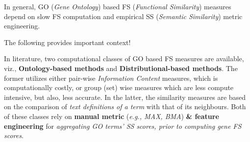 \begin{sloppypar*}
    In general, GO (\textit{Gene Ontology}) based FS (\textit{Functional Similarity})
    measures depend on slow FS computation and empirical SS (\textit{Semantic
    Similarity}) metric engineering. \hfill \break

    \begin{mybox}
        The following provides important context!
    \end{mybox}
    In literature, two computational classes of GO based FS measures are available,
    viz., \textbf{Ontology-based methods} and \textbf{Distributional-based methods}.
    The former utilizes either pair-wise \textit{Information Content} measures,
    which is computationally costly, or group (set) wise measures which are less
    compute intensive, but also, less accurate. In the latter, the similarity measures
    are based on the comparison of \textit{text definitions of a term} with that of its neighbours.
    Both of these classes rely on \textbf{manual metric} (\textit{e.g., MAX, BMA})
    \textbf{\& feature engineering} for \textit{aggregating GO terms' SS scores, prior to
    computing gene FS scores}.
\end{sloppypar*}